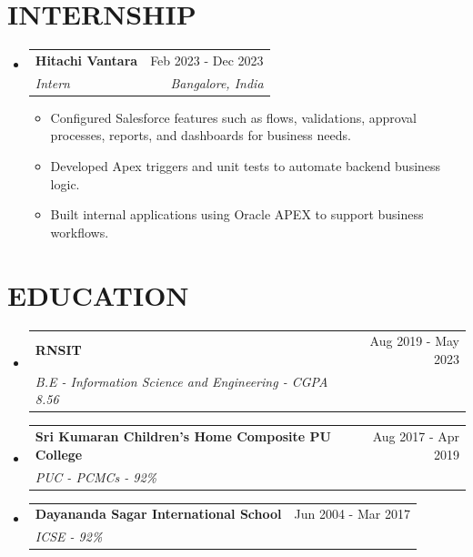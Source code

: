 \documentclass[letterpaper,11pt]{article}
\makeatletter
\newcommand{\resumeItem}[1]{\item\small{#1}}
\newcommand{\resumeSubheading}[4]{
  \item
  \begin{tabular*}{\textwidth}{l@{\extracolsep{\fill}}r}
  \textbf{\large#1} & #2 \\
  \textit{#3} & \textit{#4}
  \end{tabular*}
}
\makeatother
\begin{document}
\section{INTERNSHIP}
\begin{itemize}[leftmargin=0in,label={}]

\resumeSubheading
{Hitachi Vantara}{Feb 2023 - Dec 2023}
{Intern}{Bangalore, India}

\begin{itemize}
\resumeItem{Configured Salesforce features such as flows, validations, approval processes, reports, and dashboards for business needs.}
\resumeItem{Developed Apex triggers and unit tests to automate backend business logic.}
\resumeItem{Built internal applications using Oracle APEX to support business workflows.}
\end{itemize}

\end{itemize}

\section{EDUCATION}
\begin{itemize}[leftmargin=0in,label={}]

\resumeSubheading
{RNSIT}{Aug 2019 - May 2023}
{B.E - Information Science and Engineering - CGPA 8.56}{}

\resumeSubheading
{Sri Kumaran Children's Home Composite PU College}{Aug 2017 - Apr 2019}
{PUC - PCMCs - 92\%}{}

\resumeSubheading
{Dayananda Sagar International School}{Jun 2004 - Mar 2017}
{ICSE - 92\%}{}

\end{itemize}
\end{document}
